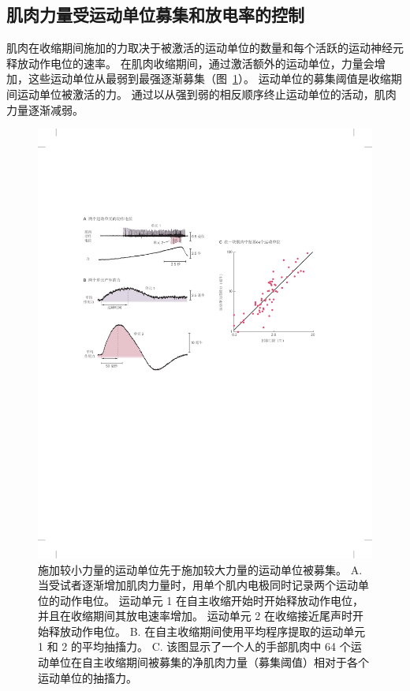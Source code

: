 \subsection{肌肉力量受运动单位募集和放电率的控制}

肌肉在收缩期间施加的力取决于被激活的运动单位的数量和每个活跃的运动神经元释放动作电位的速率。
在肌肉收缩期间，通过激活额外的运动单位，力量会增加，这些运动单位从最弱到最强逐渐募集（图~\ref{fig:31_5}）。
运动单位的募集阈值是收缩期间运动单位被激活的力。
通过以从强到弱的相反顺序终止运动单位的活动，肌肉力量逐渐减弱。


\begin{figure}[htbp]
	\centering
	\includegraphics[width=1.0\linewidth]{chap31/fig_31_5}
	\caption{施加较小力量的运动单位先于施加较大力量的运动单位被募集\cite{desmedt1977ballistic,milner1973orderly}。
	A. 当受试者逐渐增加肌肉力量时，用单个肌内电极同时记录两个运动单位的动作电位。
	运动单元 1 在自主收缩开始时开始释放动作电位，并且在收缩期间其放电速率增加。
	运动单元 2 在收缩接近尾声时开始释放动作电位。
	B. 在自主收缩期间使用平均程序提取的运动单元 1 和 2 的平均抽搐力。
	C. 该图显示了一个人的手部肌肉中 64 个运动单位在自主收缩期间被募集的净肌肉力量（募集阈值）相对于各个运动单位的抽搐力。}
	\label{fig:31_5}
\end{figure}


